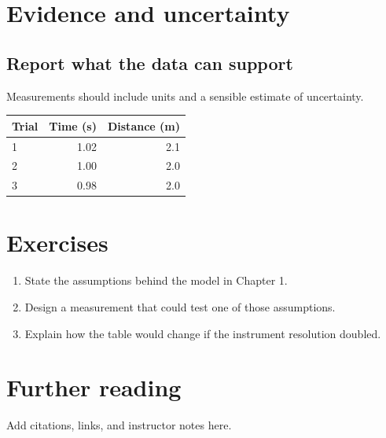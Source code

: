 \documentclass[11pt,oneside]{book}
\begin{document}
\chapter{Evidence and uncertainty}
\section{Report what the data can support}
Measurements should include units and a sensible estimate of uncertainty.
\begin{center}
\begin{tabular}{lrr}
\toprule Trial & Time (s) & Distance (m)\\\midrule
1 & 1.02 & 2.1\\ 2 & 1.00 & 2.0\\ 3 & 0.98 & 2.0\\
\bottomrule
\end{tabular}
\end{center}
\chapter{Exercises}
\begin{enumerate}
  \item State the assumptions behind the model in Chapter 1.
  \item Design a measurement that could test one of those assumptions.
  \item Explain how the table would change if the instrument resolution doubled.
\end{enumerate}
\backmatter
\chapter*{Further reading}
Add citations, links, and instructor notes here.
\printindex
\end{document}
